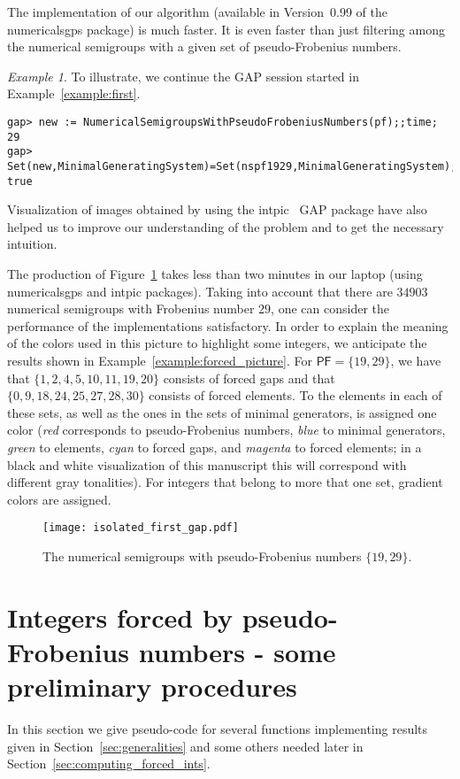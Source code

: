 \documentclass[11pt]{amsart}
\theoremstyle{remark}
\newtheorem{example}[theorem]{Example}
\begin{document}
The implementation of our algorithm (available in Version~0.99 of the \textsf{numericalsgps} package) is much faster. It is even faster than just filtering among the numerical semigroups with a given set of pseudo-Frobenius numbers. 
\begin{example}\label{example:second}
To illustrate, we continue the \textsf{GAP} session started in Example~\ref{example:first}.
\begin{verbatim}
gap> new := NumericalSemigroupsWithPseudoFrobeniusNumbers(pf);;time;
29
gap> Set(new,MinimalGeneratingSystem)=Set(nspf1929,MinimalGeneratingSystem);
true
\end{verbatim}
\end{example}

Visualization of images obtained by using the \textsf{intpic}~\cite{intpic} \textsf{GAP} package have also helped us to improve our understanding of the problem and to get the necessary intuition.

The production of Figure~\ref{fig:pfs_19_29} takes less than two minutes in our laptop (using  \textsf{numericalsgps} and \textsf{intpic} packages). Taking into account that there are $34903$ numerical semigroups with Frobenius number $29$, one can consider the performance of the implementations satisfactory.  
In order to explain the meaning of the colors used in this picture to highlight some integers, we anticipate the results shown in Example~\ref{example:forced_picture}. For ${\ensuremath{\mathsf{PF}}}=\{19,29\}$, we have that $\{1,2,4,5,10,11,19,20\}$ consists of forced gaps and that $\{0, 9, 18, 24, 25, 27, 28, 30\}$ consists of forced elements. To the elements in each of these sets, as well as the ones in the sets of minimal generators, is assigned one color (\emph{red} corresponds to pseudo-Frobenius numbers, \emph{blue} to minimal generators, \emph{green} to elements, \emph{cyan} to forced gaps, and \emph{magenta} to forced elements; in a black and white visualization of this manuscript this will correspond with different gray tonalities). For integers that belong to more that one set, gradient colors are assigned.

\begin{figure}
\begin{center}
\texttt{[image: isolated\_first\_gap.pdf]}
\end{center}
\caption{The numerical semigroups with pseudo-Frobenius numbers $\{19, 29\}$.\label{fig:pfs_19_29}}
\end{figure}

\section{Integers forced by pseudo-Frobenius numbers - some preliminary procedures}
\label{sec:preliminary_forced_ints}
In this section we give pseudo-code for several functions implementing results given in Section~\ref{sec:generalities} and some others needed later in Section~\ref{sec:computing_forced_ints}.
\end{document}
